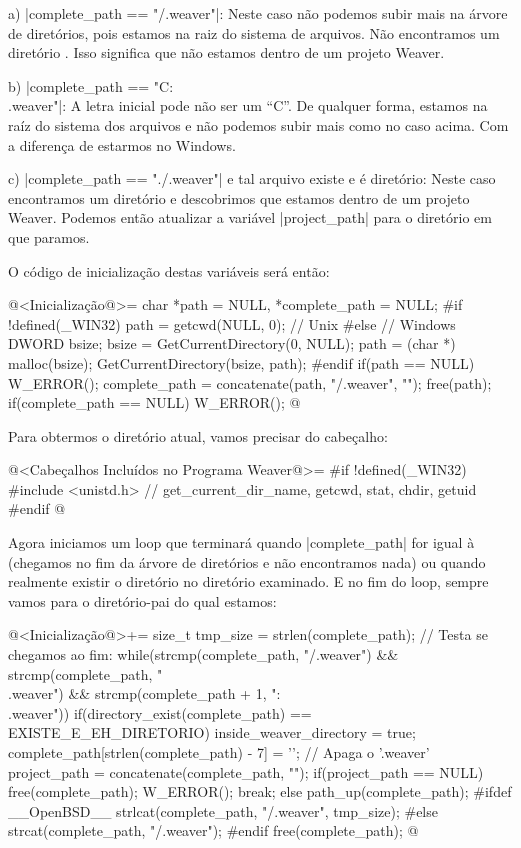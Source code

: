 {a) |complete_path == "/.weaver"|: Neste caso não podemos subir mais na
árvore de diretórios, pois estamos na raiz do sistema de arquivos. Não
encontramos um diretório . Isso significa que não
estamos dentro de um projeto Weaver.

b) |complete_path == "C:\\.weaver"|: A letra inicial pode não ser um
``C''. De qualquer forma, estamos na raíz do sistema dos arquivos e
não podemos subir mais como no caso acima. Com a diferença de estarmos
no Windows.

c) |complete_path == "./.weaver"| e tal arquivo existe e é diretório:
Neste caso encontramos um diretório  e descobrimos
que estamos dentro de um projeto Weaver. Podemos então atualizar a
variável |project_path| para o diretório em que paramos.

O código de inicialização destas variáveis será então:

\iniciocodigo
@<Inicialização@>=
char *path = NULL, *complete_path = NULL;
#if !defined(_WIN32)
path = getcwd(NULL, 0); // Unix
#else
{ // Windows
  DWORD bsize;
  bsize = GetCurrentDirectory(0, NULL);
  path = (char *) malloc(bsize);
  GetCurrentDirectory(bsize, path);
}
#endif
if(path == NULL) W_ERROR();
complete_path = concatenate(path, "/.weaver", "");
free(path);
if(complete_path == NULL) W_ERROR();
@
\fimcodigo

Para obtermos o diretório atual, vamos precisar do cabeçalho:

\iniciocodigo
@<Cabeçalhos Incluídos no Programa Weaver@>=
#if !defined(_WIN32)
#include <unistd.h> // get_current_dir_name, getcwd, stat, chdir, getuid
#endif
@
\fimcodigo

Agora iniciamos um loop que terminará quando |complete_path| for igual
à  (chegamos no fim da árvore de diretórios e não
encontramos nada) ou quando realmente existir o
diretório  no diretório examinado. E no fim do
loop, sempre vamos para o diretório-pai do qual estamos:

\iniciocodigo
@<Inicialização@>+=
{
  size_t tmp_size = strlen(complete_path);
  // Testa se chegamos ao fim:
  while(strcmp(complete_path, "/.weaver") &&
	strcmp(complete_path, "\\.weaver") &&
	strcmp(complete_path + 1, ":\\.weaver")){
    if(directory_exist(complete_path) == EXISTE_E_EH_DIRETORIO){
      inside_weaver_directory = true;
      complete_path[strlen(complete_path) - 7] = '\0'; // Apaga o '.weaver'
      project_path = concatenate(complete_path, "");
      if(project_path == NULL){ free(complete_path); W_ERROR(); }
      break;
    }
    else{
      path_up(complete_path);
#ifdef __OpenBSD__
      strlcat(complete_path, "/.weaver", tmp_size);
#else
      strcat(complete_path, "/.weaver");
#endif
    }
  }
  free(complete_path);
}
@
\fimcodigo

}
